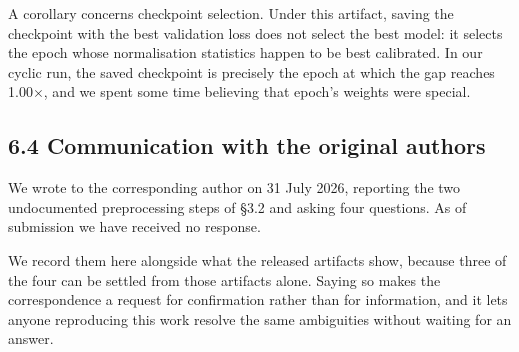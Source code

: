 \documentclass[10pt]{article}
\begin{document}
A corollary concerns checkpoint selection. Under this artifact, saving the
checkpoint with the best validation loss does not select the best model: it
selects the epoch whose normalisation statistics happen to be best calibrated.
In our cyclic run, the saved checkpoint is precisely the epoch at which the gap
reaches 1.00$\times$, and we spent some time believing that epoch's weights were
special.

\subsection{6.4 Communication with the original authors}\label{communication-with-the-original-authors}

We wrote to the corresponding author on 31 July 2026, reporting the two
undocumented preprocessing steps of \S{}3.2 and asking four questions. As of
submission we have received no response.

We record them here alongside what the released artifacts show, because three of
the four can be settled from those artifacts alone. Saying so makes the
correspondence a request for confirmation rather than for information, and it
lets anyone reproducing this work resolve the same ambiguities without waiting
for an answer.
\end{document}
